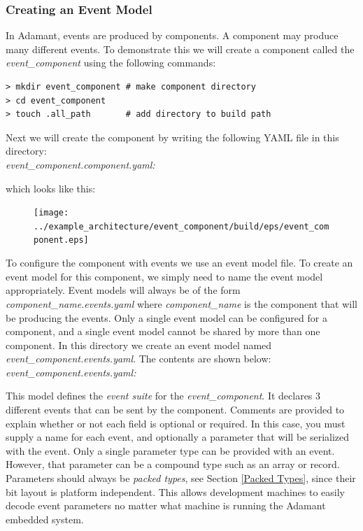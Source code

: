 \subsubsection{Creating an Event Model}

In Adamant, events are produced by components. A component may produce many different events. To demonstrate this we will create a component called the \textit{event\_component} using the following commands:

\vspace{5mm} %
\begin{verbatim}
> mkdir event_component # make component directory
> cd event_component 
> touch .all_path       # add directory to build path
\end{verbatim}
\vspace{5mm} %

Next we will create the component by writing the following YAML file in this directory: \\

\textit{event\_component.component.yaml:}

which looks like this:

\begin{figure}[H]
  \texttt{[image: ../example\_architecture/event\_component/build/eps/event\_component.eps]}
\end{figure}

To configure the component with events we use an event model file. To create an event model for this component, we simply need to name the event model appropriately. Event models will always be of the form \textit{component\_name.events.yaml} where \textit{component\_name} is the component that will be producing the events. Only a single event model can be configured for a component, and a single event model cannot be shared by more than one component. In this directory we create an event model named \textit{event\_component.events.yaml}. The contents are shown below: \\

\textit{event\_component.events.yaml:}

This model defines the \textit{event suite} for the \textit{event\_component}. It declares 3 different events that can be sent by the component. Comments are provided to explain whether or not each field is optional or required. In this case, you must supply a name for each event, and optionally a parameter that will be serialized with the event. Only a single parameter type can be provided with an event. However, that parameter can be a compound type such as an array or record. Parameters should always be \textit{packed types}, see Section \ref{Packed Types}, since their bit layout is platform independent. This allows development machines to easily decode event parameters no matter what machine is running the Adamant embedded system. \\

